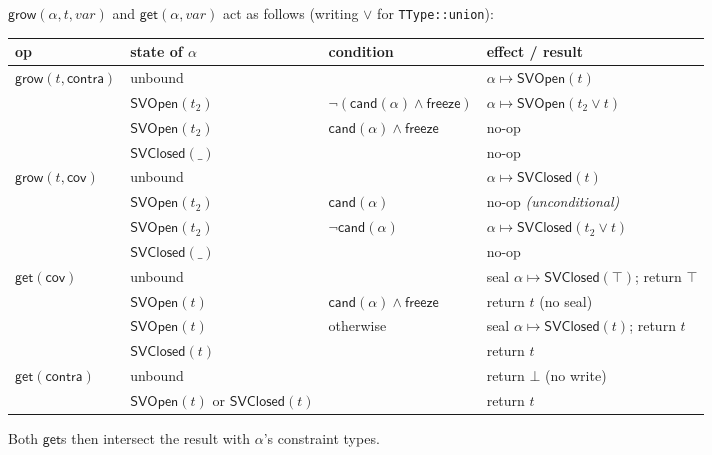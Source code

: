 \documentclass[11pt]{article}
\newcommand{\SVOpen}{\mathsf{SVOpen}}
\newcommand{\SVClosed}{\mathsf{SVClosed}}
\begin{document}
\begin{definition}[Transitions]
\label{def:transitions}
$\mathsf{grow}(\alpha, t, \mathit{var})$ and
$\mathsf{get}(\alpha, \mathit{var})$ act as follows
(writing $\vee$ for \texttt{TType::union}):
\begin{center}
\renewcommand{\arraystretch}{1.2}
\begin{tabular}{@{}llll@{}}
\toprule
op & state of $\alpha$ & condition & effect / result \\
\midrule
$\mathsf{grow}(t,\mathsf{contra})$ & unbound & &
  $\alpha \mapsto \SVOpen(t)$ \\
 & $\SVOpen(t_2)$ & $\neg(\mathsf{cand}(\alpha) \wedge \mathsf{freeze})$ &
  $\alpha \mapsto \SVOpen(t_2 \vee t)$ \\
 & $\SVOpen(t_2)$ & $\mathsf{cand}(\alpha) \wedge \mathsf{freeze}$ & no-op \\
 & $\SVClosed(\_)$ & & no-op \\
\midrule
$\mathsf{grow}(t,\mathsf{cov})$ & unbound & &
  $\alpha \mapsto \SVClosed(t)$ \\
 & $\SVOpen(t_2)$ & $\mathsf{cand}(\alpha)$ & no-op \emph{(unconditional)} \\
 & $\SVOpen(t_2)$ & $\neg\mathsf{cand}(\alpha)$ &
  $\alpha \mapsto \SVClosed(t_2 \vee t)$ \\
 & $\SVClosed(\_)$ & & no-op \\
\midrule
$\mathsf{get}(\mathsf{cov})$ & unbound & & seal $\alpha \mapsto
  \SVClosed(\top)$; return $\top$ \\
 & $\SVOpen(t)$ & $\mathsf{cand}(\alpha) \wedge \mathsf{freeze}$ &
  return $t$ (no seal) \\
 & $\SVOpen(t)$ & otherwise & seal $\alpha \mapsto \SVClosed(t)$; return $t$\\
 & $\SVClosed(t)$ & & return $t$ \\
\midrule
$\mathsf{get}(\mathsf{contra})$ & unbound & & return $\bot$ (no write) \\
 & $\SVOpen(t)$ or $\SVClosed(t)$ & & return $t$ \\
\bottomrule
\end{tabular}
\end{center}
Both $\mathsf{get}$s then intersect the result with $\alpha$'s constraint
types. 
\end{definition}
\end{document}

